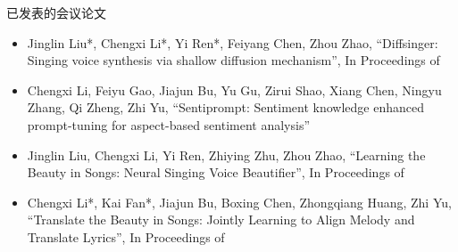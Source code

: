 \cleardoublepage
{}
\noindent 已发表的会议论文
\begin{itemize}
  \item Jinglin Liu*, Chengxi Li*, Yi Ren*, Feiyang Chen, Zhou Zhao, ``Diffsinger: Singing voice synthesis via shallow diffusion mechanism'', In Proceedings of
  \item Chengxi Li, Feiyu Gao, Jiajun Bu, Yu Gu, Zirui Shao, Xiang Chen, Ningyu Zhang, Qi Zheng, Zhi Yu, ``Sentiprompt: Sentiment knowledge enhanced prompt-tuning for aspect-based sentiment analysis''
  \item Jinglin Liu, Chengxi Li, Yi Ren, Zhiying Zhu, Zhou Zhao, ``Learning the Beauty in Songs: Neural Singing Voice Beautifier'', In Proceedings of
  \item Chengxi Li*, Kai Fan*, Jiajun Bu, Boxing Chen, Zhongqiang Huang, Zhi Yu, ``Translate the Beauty in Songs: Jointly Learning to Align Melody and Translate Lyrics'', In Proceedings of
\end{itemize}

